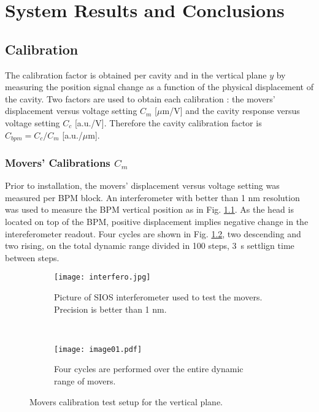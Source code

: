 \chapter{System Results and Conclusions}
\section{Calibration}\label{s:cals}
The calibration factor is obtained per cavity and in the vertical plane $y$ by measuring the position signal change as a function of the physical displacement of the cavity. Two factors are used to obtain each calibration : the movers' displacement versus voltage setting $C_m$ [$\mu$m/V] and the cavity response versus voltage setting $C_c$ [a.u./V]. Therefore the cavity calibration factor is $C_{bpm}=C_c/C_m$ [a.u./$\mu$m].\par
\subsection{Movers' Calibrations $C_m$}\label{s:calcm}
Prior to installation, the movers' displacement versus voltage setting was measured per BPM block. An interferometer with better than 1 nm resolution was used to measure the BPM vertical position as in Fig. \ref{f:interfero}. As the head is located on top of the BPM, positive displacement implies negative change in the intereferometer readout. Four cycles are shown in Fig. \ref{f:fourcycles}, two descending and two rising, on the total dynamic range divided in 100 steps, 3~s settlign time between steps.\par
\begin{figure}[!htb]
\centering
\begin{subfigure}[b]{0.9\textwidth}
\centering
\texttt{[image: interfero.jpg]}\caption{Picture of SIOS interferometer used to test the movers. Precision is better than 1 nm.}\label{f:interfero}
\end{subfigure}\\%
\begin{subfigure}[b]{0.9\textwidth}
\centering
\texttt{[image: image01.pdf]}\caption{Four cycles are performed over the entire dynamic range of movers.}\label{f:fourcycles}
\end{subfigure}\caption{Movers calibration test setup for the vertical plane.}\label{f:cmtest}
\end{figure}
